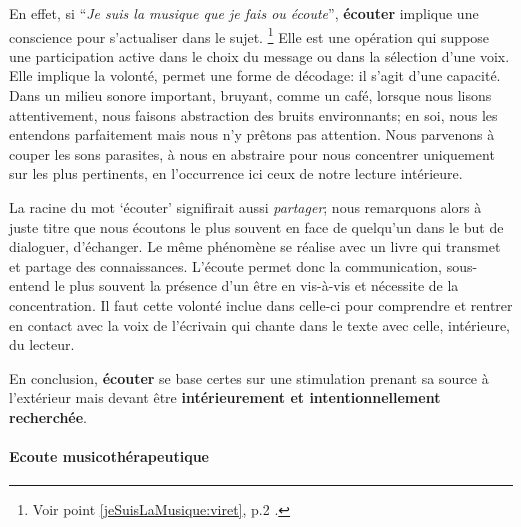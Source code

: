 En effet, si \enquote{\emph{Je suis la musique que je fais ou écoute}}\autocite{viret:b}, \textbf{écouter} implique 
une conscience pour s'actualiser dans le sujet. \footnote{Voir point
  \ref{jeSuisLaMusique:viret}, p.2 \pageref{jeSuisLaMusique:viret}.}
Elle est une opération 
qui suppose une participation active dans le choix du message
ou dans la sélection d'une voix. Elle  implique la volonté,
permet une forme de décodage: il s'agit d'une capacité.
Dans un milieu sonore important,
 bruyant, comme un café, lorsque nous lisons attentivement, nous faisons abstraction
des bruits environnants; en soi, nous les entendons parfaitement mais nous n'y
prêtons pas attention. Nous parvenons à couper les sons parasites, à nous en abstraire pour
nous concentrer uniquement sur les plus  pertinents, en l'occurrence
ici ceux de notre lecture intérieure.




  La racine du mot `écouter' signifirait aussi \emph{partager}; nous
  remarquons alors à juste titre que nous écoutons le plus souvent en
  face de quelqu'un dans le but de dialoguer, d'échanger. Le même
  phénomène se réalise avec un livre qui transmet et partage des
  connaissances. L'écoute permet donc la communication, sous-entend le
  plus souvent la présence d'un être en vis-à-vis et nécessite de la
  concentration. Il faut cette volonté inclue dans celle-ci  pour
  comprendre et rentrer en contact avec la voix de  l'écrivain qui
  chante dans le texte avec celle, intérieure, du lecteur.

  
En conclusion, \textbf{écouter} se base certes sur une stimulation prenant sa source à 
l'extérieur mais devant être \textbf{ intérieurement et intentionnellement
	recherchée}.




      \paragraph{Ecoute musicothérapeutique}
      


